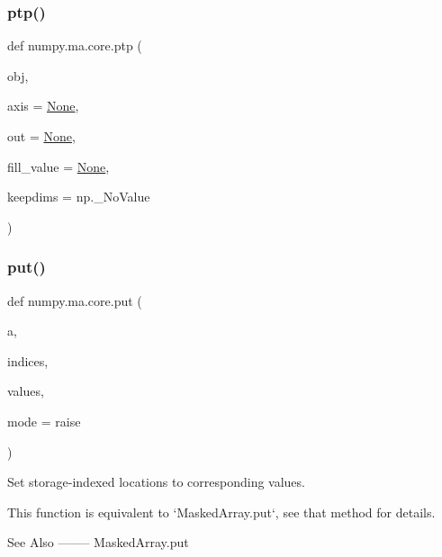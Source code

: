 \subsubsection{\texorpdfstring{ptp()}{ptp()}}
{\footnotesize\ttfamily def numpy.\+ma.\+core.\+ptp (\begin{DoxyParamCaption}\item[{}]{obj,  }\item[{}]{axis = {\ttfamily \hyperlink{namespacenumpy_1_1ma_1_1core_a647ee1848dfa3692fe35a663a2aa40b3}{None}},  }\item[{}]{out = {\ttfamily \hyperlink{namespacenumpy_1_1ma_1_1core_a647ee1848dfa3692fe35a663a2aa40b3}{None}},  }\item[{}]{fill\+\_\+value = {\ttfamily \hyperlink{namespacenumpy_1_1ma_1_1core_a647ee1848dfa3692fe35a663a2aa40b3}{None}},  }\item[{}]{keepdims = {\ttfamily np.\+\_\+NoValue} }\end{DoxyParamCaption})}

\mbox{\label{namespacenumpy_1_1ma_1_1core_a2b3ba13aeb614f7dab7926ce0c8c1b74}} 
\subsubsection{\texorpdfstring{put()}{put()}}
{\footnotesize\ttfamily def numpy.\+ma.\+core.\+put (\begin{DoxyParamCaption}\item[{}]{a,  }\item[{}]{indices,  }\item[{}]{values,  }\item[{}]{mode = {\ttfamily \textquotesingle{}raise\textquotesingle{}} }\end{DoxyParamCaption})}

\begin{DoxyVerb}Set storage-indexed locations to corresponding values.

This function is equivalent to `MaskedArray.put`, see that method
for details.

See Also
--------
MaskedArray.put\end{DoxyVerb}
 \mbox{\label{namespacenumpy_1_1ma_1_1core_af8f7ccab53689a71415c28b92704735d}} 
